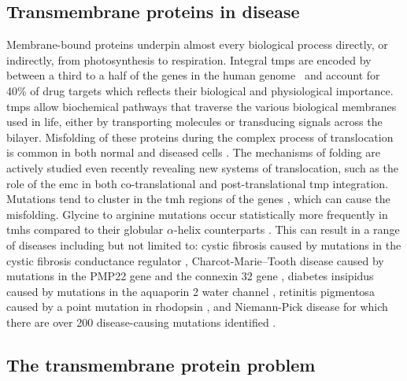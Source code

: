 \subsection{Transmembrane proteins in disease}
Membrane\--bound proteins underpin almost every biological process directly, or indirectly, from photosynthesis to respiration.
Integral \gls{tmp}s are encoded by between a third to a half of the genes in the human genome~\cite{Hopkins2002, Almen2009, Wang2013} and account for 40\% of drug targets \cite{Overington2006} which reflects their biological and physiological importance.
\gls{tmp}s allow biochemical pathways that traverse the various biological membranes used in life, either by transporting molecules or transducing signals across the bilayer.
Misfolding of these proteins during the complex process of translocation is common in both normal and diseased cells \cite{Ruggiano2014}.
The mechanisms of folding are actively studied even recently revealing new systems of translocation, such as the role of the \gls{emc} in both co\--translational \cite{Shurtleff2018} and post\--translational \cite{Guna2018a} \gls{tmp} integration.
Mutations tend to cluster in the \gls{tmh} regions of the genes \cite{Sanders2004}, which can cause the misfolding.
Glycine to arginine mutations occur statistically more frequently in \gls{tmh}s compared to their globular $\alpha$\--helix counterparts \cite{Partridge2002}.
This can result in a range of diseases including but not limited to: cystic fibrosis caused by mutations in the cystic fibrosis conductance regulator \cite{Riordan1989}, Charcot\--Marie\---Tooth disease caused by mutations in the PMP22 gene \cite{Roa1993} and the connexin 32 gene \cite{Fairweather1994}, diabetes insipidus caused by mutations in the aquaporin 2 water channel \cite{vanLieburg1994}, retinitis pigmentosa caused by a point mutation in rhodopsin \cite{Dryja1990}, and Niemann\--Pick disease for which there are over 200 disease\--causing mutations identified \cite{Gelsthorpe2008, Park2003, Scott2004, Fernandez-Valero2005}.

\subsection{The transmembrane protein problem}

